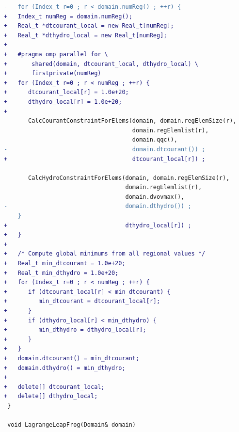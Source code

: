 \begin{lstlisting}[language=diff,basicstyle=\ttfamily\scriptsize,breaklines=true,caption={llnl_c1/lulesh — FASTER (e6x_1)}]
-   for (Index_t r=0 ; r < domain.numReg() ; ++r) {
+   Index_t numReg = domain.numReg();
+   Real_t *dtcourant_local = new Real_t[numReg];
+   Real_t *dthydro_local = new Real_t[numReg];
+
+   #pragma omp parallel for \
+       shared(domain, dtcourant_local, dthydro_local) \
+       firstprivate(numReg)
+   for (Index_t r=0 ; r < numReg ; ++r) {
+      dtcourant_local[r] = 1.0e+20;
+      dthydro_local[r] = 1.0e+20;
+
       CalcCourantConstraintForElems(domain, domain.regElemSize(r),
                                     domain.regElemlist(r),
                                     domain.qqc(),
-                                    domain.dtcourant()) ;
+                                    dtcourant_local[r]) ;
 
       CalcHydroConstraintForElems(domain, domain.regElemSize(r),
                                   domain.regElemlist(r),
                                   domain.dvovmax(),
-                                  domain.dthydro()) ;
-   }
+                                  dthydro_local[r]) ;
+   }
+
+   /* Compute global minimums from all regional values */
+   Real_t min_dtcourant = 1.0e+20;
+   Real_t min_dthydro = 1.0e+20;
+   for (Index_t r=0 ; r < numReg ; ++r) {
+      if (dtcourant_local[r] < min_dtcourant) {
+         min_dtcourant = dtcourant_local[r];
+      }
+      if (dthydro_local[r] < min_dthydro) {
+         min_dthydro = dthydro_local[r];
+      }
+   }
+   domain.dtcourant() = min_dtcourant;
+   domain.dthydro() = min_dthydro;
+
+   delete[] dtcourant_local;
+   delete[] dthydro_local;
 }
 
 void LagrangeLeapFrog(Domain& domain)
\end{lstlisting}
